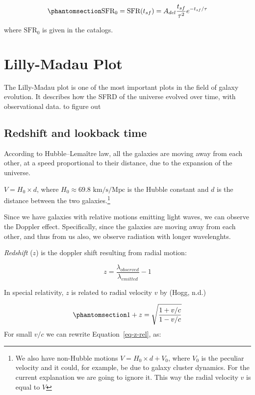 \documentclass[
]{article}
\begin{document}
\begin{equation}\phantomsection\label{eq-delayed-current}{
\text{SFR}_0 = \text{SFR}(t_{sf}) = A_{del}\frac{t_{sf}}{\tau^2}e^{-t_{sf}/\tau}
}\end{equation}

where \(\text{SFR}_0\) is given in the catalogs.

\section{Lilly-Madau Plot}\label{lilly-madau-plot}

The Lilly-Madau plot is one of the most important plots in the field of
galaxy evolution. It describes how the SFRD of the universe evolved over
time, with observational data. to figure out

\subsection{Redshift and lookback
time}\label{redshift-and-lookback-time}

According to Hubble--Lemaître law, all the galaxies are moving away from
each other, at a speed proportional to their distance, due to the
expansion of the universe.

\(V = H_0\times d\), where \(H_0 \approx 69.8 \text{ km/s/Mpc}\) is the
Hubble constant and \(d\) is the distance between the two
galaxies.\footnote{We also have non-Hubble motions
  \(V = H_0\times d + V_0\), where \(V_0\) is the peculiar velocity and
  it could, for example, be due to galaxy cluster dynamics. For the
  current explanation we are going to ignore it. This way the radial
  velocity \(v\) is equal to \(V\)}

Since we have galaxies with relative motions emitting light waves, we
can observe the Doppler effect. Specifically, since the galaxies are
moving away from each other, and thus from us also, we observe radiation
with longer wavelenghts.

\emph{Redshift} (\(z\)) is the doppler shift resulting from radial
motion:

\[
z = \frac{\lambda_{observed}}{\lambda_{emitted}}-1
\]

In special relativity, \(z\) is related to radial velocity \(v\) by
(Hogg, n.d.)

\begin{equation}\phantomsection\label{eq-z-rel}{
1+z = \sqrt{\frac{1+v/c}{1-v/c}}
}\end{equation} For small \(v/c\) we can rewrite
Equation~\ref{eq-z-rel}, as:
\end{document}
